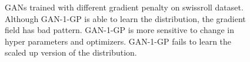 \documentclass{article} %
\begin{document}
\begin{figure}[h!]
\centering
{}

\caption{GANs trained with different gradient penalty on swissroll dataset. Although GAN-1-GP is able to learn the distribution, the gradient field has bad pattern. GAN-1-GP is more sensitive to change in hyper parameters and optimizers. GAN-1-GP fails to learn the scaled up version of the distribution.}
\end{figure}
\end{document}
